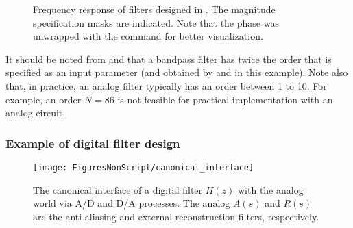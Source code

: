 

\begin{figure}
\centering
  \caption{Frequency response of filters designed in . The magnitude specification masks are indicated. Note that the phase was unwrapped with the command  for better visualization.}
  \label{fig:somefilters}
\end{figure}

It should be noted from  and  that a bandpass filter has twice the order that is specified as an input parameter (and obtained by  and  in this example). Note also that, in practice, an analog filter typically has an order between 1 to 10. For example, an order $N=86$ is not feasible for practical implementation with an analog circuit.
\eExample 

\subsubsection{Example of digital filter design}

\begin{figure}
\centering
\texttt{[image: FiguresNonScript/canonical\_interface]}
\caption[{The canonical interface of a digital filter $H(z)$ with the analog world via A/D and D/A processes.}]{The canonical interface of a digital filter $H(z)$ with the analog world via A/D and D/A processes. The analog $A(s)$ and $R(s)$ are the anti-aliasing and external reconstruction filters, respectively.\label{fig:canonical_interface}}
\end{figure}

